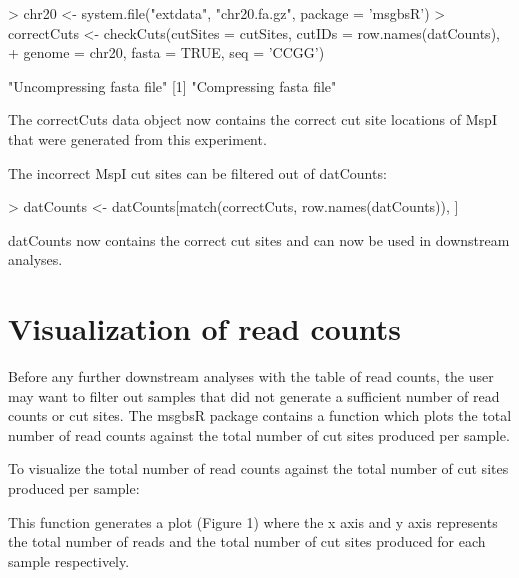 \documentclass{article}
\begin{document}
\begin{Schunk}
\begin{Sinput}
> chr20 <- system.file("extdata", "chr20.fa.gz", package = 'msgbsR')
> correctCuts <- checkCuts(cutSites = cutSites, cutIDs = row.names(datCounts),
+                          genome = chr20, fasta = TRUE, seq = 'CCGG')
\end{Sinput}
\begin{Soutput}
[1] "Uncompressing fasta file"
[1] "Compressing fasta file"
\end{Soutput}
\end{Schunk}

The correctCuts data object now contains the correct cut site locations of MspI that were generated from this experiment.

The incorrect MspI cut sites can be filtered out of datCounts:
\begin{Schunk}
\begin{Sinput}
> datCounts <- datCounts[match(correctCuts, row.names(datCounts)), ]
\end{Sinput}
\end{Schunk}

datCounts now contains the correct cut sites and can now be used in downstream analyses.

\section{Visualization of read counts}

Before any further downstream analyses with the table of read counts, the user may want to filter out samples that did not generate a sufficient number of read counts or cut sites. The msgbsR package contains a function which plots the total number of read counts against the total number of cut sites produced per sample.

To visualize the total number of read counts against the total number of cut sites produced per sample:
\begin{Schunk}
\end{Schunk}

This function generates a plot (Figure 1) where the x axis and y axis represents the total number of reads and the total number of cut sites produced for each sample respectively.
\end{document}
